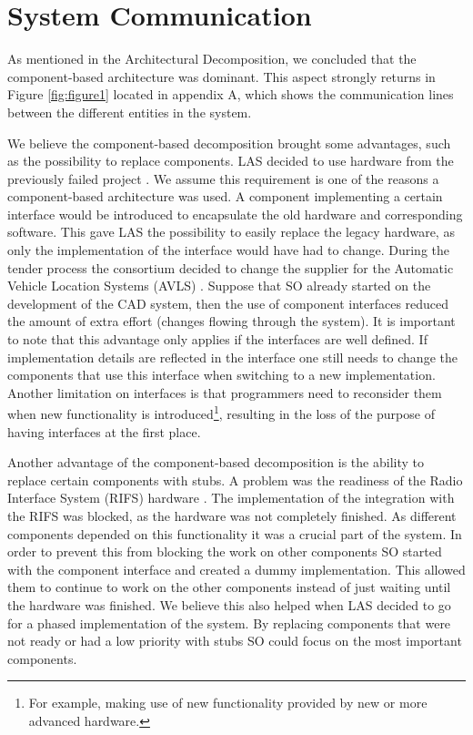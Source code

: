 \section*{System Communication}

As mentioned in the Architectural Decomposition, we concluded that the component-based architecture was dominant.
This aspect strongly returns in Figure \ref{fig:figure1} located in appendix A,
which shows the communication lines between the different entities in the system.

We believe the component-based decomposition brought some advantages, such as the possibility to replace components.
LAS decided to use hardware from the previously failed project \autocite[8]{kramer1996succeedings}.
We assume this requirement is one of the reasons a component-based architecture was used.
A component implementing a certain interface would be introduced to encapsulate the old hardware and corresponding software.
This gave LAS the possibility to easily replace the legacy hardware, as only the implementation of the interface would have had to change.
During the tender process the consortium decided to change the supplier for the Automatic Vehicle Location Systems (AVLS) \autocite[3073]{officialreport}.
Suppose that SO already started on the development of the CAD system, then the use of component interfaces reduced the amount of extra effort (changes flowing through the system).
It is important to note that this advantage only applies if the interfaces are well defined.
If implementation details are reflected in the interface one still needs to change the components that use this interface when switching to a new implementation.
Another limitation on interfaces is that programmers need to reconsider them when new functionality is introduced\footnote{For example, making use of new functionality provided by new or more advanced hardware.},
resulting in the loss of the purpose of having interfaces at the first place.

Another advantage of the component-based decomposition is the ability to replace certain components with stubs.
A problem was the readiness of the Radio Interface System (RIFS) hardware \autocite[3074]{officialreport}.
The implementation of the integration with the RIFS was blocked, as the hardware was not completely finished.
As different components depended on this functionality it was a crucial part of the system.
In order to prevent this from blocking the work on other components SO started with the component interface and created a dummy implementation.
This allowed them to continue to work on the other components instead of just waiting until the hardware was finished.
We believe this also helped when LAS decided to go for a phased implementation of the system.
By replacing components that were not ready or had a low priority with stubs SO could focus on the most important components.

